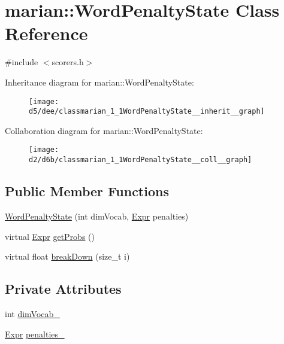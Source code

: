 \hypertarget{classmarian_1_1WordPenaltyState}{}\section{marian\+:\+:Word\+Penalty\+State Class Reference}
\label{classmarian_1_1WordPenaltyState}


{\ttfamily \#include $<$scorers.\+h$>$}



Inheritance diagram for marian\+:\+:Word\+Penalty\+State\+:
\nopagebreak
\begin{figure}[H]
\begin{center}
\leavevmode
\texttt{[image: d5/dee/classmarian\_1\_1WordPenaltyState\_\_inherit\_\_graph]}
\end{center}
\end{figure}


Collaboration diagram for marian\+:\+:Word\+Penalty\+State\+:
\nopagebreak
\begin{figure}[H]
\begin{center}
\leavevmode
\texttt{[image: d2/d6b/classmarian\_1\_1WordPenaltyState\_\_coll\_\_graph]}
\end{center}
\end{figure}
\subsection*{Public Member Functions}
\begin{DoxyCompactItemize}
\item 
\hyperlink{classmarian_1_1WordPenaltyState_a075d3bcf9f62755af0b42f2a6015df42}{Word\+Penalty\+State} (int dim\+Vocab, \hyperlink{namespacemarian_a498d8baf75b754011078b890b39c8e12}{Expr} penalties)
\item 
virtual \hyperlink{namespacemarian_a498d8baf75b754011078b890b39c8e12}{Expr} \hyperlink{classmarian_1_1WordPenaltyState_a785626a12dcffe85dca004b7536ba927}{get\+Probs} ()
\item 
virtual float \hyperlink{classmarian_1_1WordPenaltyState_aaef5349b3175fbf3d88cee8a72348259}{break\+Down} (size\+\_\+t i)
\end{DoxyCompactItemize}
\subsection*{Private Attributes}
\begin{DoxyCompactItemize}
\item 
int \hyperlink{classmarian_1_1WordPenaltyState_a24b1e41e0b8078130f117967c7ab6f9d}{dim\+Vocab\+\_\+}
\item 
\hyperlink{namespacemarian_a498d8baf75b754011078b890b39c8e12}{Expr} \hyperlink{classmarian_1_1WordPenaltyState_a716a4f8bba2055eab2bcaf121ce91fb7}{penalties\+\_\+}
\end{DoxyCompactItemize}


